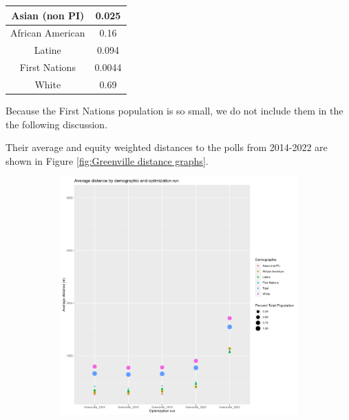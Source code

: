 \documentclass[11pt]{article}
\theoremstyle{remark}
\theoremstyle{definition}
\begin{document}
\begin{tabular} {| c | c |} 
	\hline
	Asian (non PI) &  0.025 \\ \hline
	African American & 0.16 \\ \hline
	Latine & 0.094 \\ \hline
	First Nations & 0.0044 \\ \hline
	White  & 0.69 \\ \hline
\end{tabular}

Because the First Nations population is so small, we do not include them in the the following discussion.

Their average and equity weighted distances to the polls from 2014-2022 are shown in Figure \ref{fig:Greenville distance graphs}.

\begin{figure}
	\begin{subfigure}{.8\textwidth}
		\centering
		\includegraphics[width=.8\linewidth]{result analysis/Greenville_SC_original_configs/orig_pop_scaled_avg}
		\label{sfig:Greenville avg dist}
	\end{subfigure} \newline
	\begin{subfigure}{.8\textwidth}
		\centering

\end{subfigure}
\end{figure}
\end{document}
